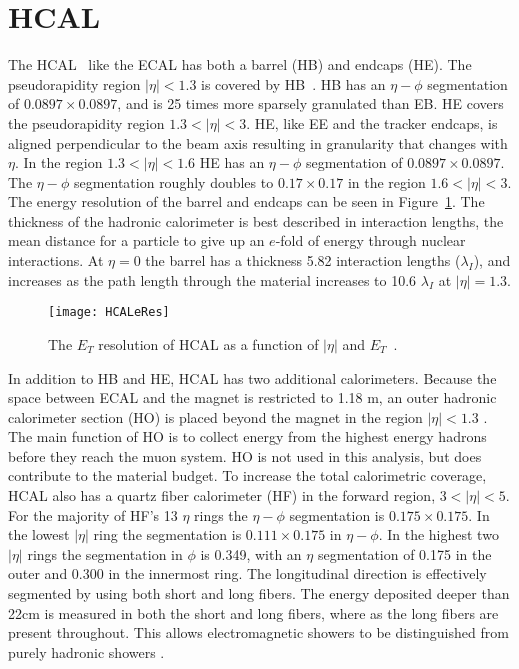   \section{HCAL}
    The HCAL~\cite{Baiatian:2007xva} like the ECAL has both a barrel (HB) and endcaps (HE).
    The pseudorapidity region $|\eta|<1.3$ is covered by HB~\cite{tCmsE}. 
    HB has an $\eta-\phi$ segmentation of $0.0897\times0.0897$, and is 25 times more
    	sparsely granulated than EB.
    HE covers the pseudorapidity region $1.3<|\eta|<3$.
    HE, like EE and the tracker endcaps, is aligned perpendicular to the beam axis
    	resulting in granularity that changes with $\eta$.
    In the region $1.3 <|\eta|< 1.6$ HE has an $\eta-\phi$ segmentation of 
    	$0.0897\times0.0897$.
    The $\eta-\phi$ segmentation roughly doubles to $0.17\times0.17$ in the region
    	$1.6 <|\eta|< 3$.
    The energy resolution of the barrel and endcaps can be seen in  
    	Figure~\ref{HCALeRes}.
    The thickness of the hadronic calorimeter is best described in interaction
    	lengths, the mean distance for a particle to give up an $e$-fold of energy
    	through nuclear interactions. 
    At $\eta = 0$ the barrel has a thickness 5.82 interaction lengths 
    	($\lambda_{I}$), and increases as the path length through the material 
    	increases to 10.6 $\lambda_{I}$ at $|\eta| = 1.3$.
    \begin{figure}[h]
      \centering
        \texttt{[image: HCALeRes]}
      \caption{The $E_{T}$ resolution of HCAL as a function of $|\eta|$ and 
        $E_{T}$~\cite{tCmsE}.}
      \label{HCALeRes}
    \end{figure}
    
    In addition to HB and HE, HCAL has two additional calorimeters.
    Because the space between ECAL and the magnet is restricted to 1.18 m, an
    	outer hadronic calorimeter section (HO) is placed beyond the magnet
    	in the region $|\eta|<1.3$ \cite{tCmsE}.
    The main function of HO is to collect energy from the highest energy hadrons
    	before they reach the muon system.
    HO is not used in this analysis, but does contribute to the material budget. 
    To increase the total calorimetric coverage, HCAL also has a quartz fiber 
    	calorimeter (HF) in the forward region, $3 < |\eta| < 5$.
    For the majority of HF's 13 $\eta$ rings the $\eta-\phi$ segmentation is 
    	$0.175\times0.175$.
    In the lowest $|\eta|$ ring the segmentation is $0.111\times0.175$ in 
    	$\eta-\phi$.
    In the highest two $|\eta|$ rings the segmentation in $\phi$ is 0.349, with an
    	$\eta$ segmentation of 0.175 in the outer and 0.300 in the innermost 
    	ring. 
    The longitudinal direction is effectively segmented by using both short and
    	long fibers.
    The energy deposited deeper than 22cm is measured in both the short
    	and long fibers, where as the long fibers are present throughout.
    This allows electromagnetic showers to be distinguished from purely hadronic 
    	showers \cite{tCmsE}.

